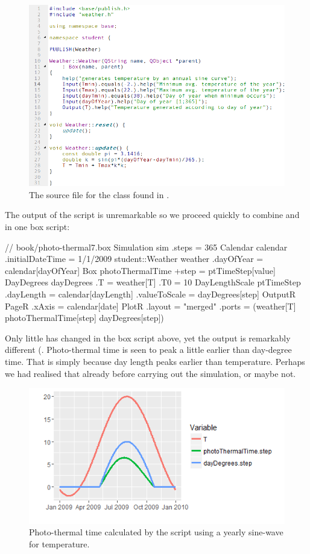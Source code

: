 \begin{figure} [bh]
\centering
\includegraphics[scale=0.7]{graphics/qt-creator-weather-cpp}
\caption{The source file for the  class found in .}
\label{fig:qt-creator-weather-cpp}
\end{figure}

The output of the  script is unremarkable so we proceed quickly to combine  and  in one box script:

\lstset{numbers=left}
\begin{boxscript}
// book/photo-thermal7.box
Simulation sim {
  .steps = 365
  Calendar calendar {
    .initialDateTime = 1/1/2009
  }
  student::Weather weather {
    .dayOfYear = calendar[dayOfYear]
  }
  Box photoThermalTime {
    +step = ptTimeStep[value]
    DayDegrees dayDegrees {
      .T = weather[T]
      .T0 = 10
    }
    DayLengthScale ptTimeStep {
      .dayLength = calendar[dayLength]
      .valueToScale = dayDegrees[step]
    }
  }
  OutputR {
    PageR {
      .xAxis = calendar[date]
      PlotR {
        .layout = "merged"
        .ports = (weather[T] photoThermalTime[step] dayDegrees[step])
      }
    }
  }
}\end{boxscript}
\lstset{numbers=none}

Only little has changed in the box script above, yet the output is remarkably different (. Photo-thermal time is seen to peak a little earlier than day-degree time. That is simply because day length peaks earlier than temperature. Perhaps we had realised that already before carrying out the simulation, or maybe not.

\begin{figure}
\centering
\includegraphics[width=\textwidth]{graphics/photo-thermal-plot2}
\caption{Photo-thermal time calculated by the  script using a yearly sine-wave for temperature.}
\label{fig:photo-thermal-plot2}
\end{figure}
